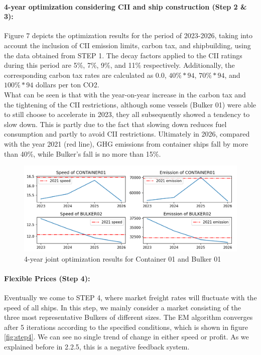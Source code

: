 \documentclass[a4paper,12pt]{article}
\begin{document}
\paragraph{4-year optimization considering CII and ship construction (Step 2 \& 3):}

Figure 7 depicts the optimization results for the period of 2023-2026, taking into account the inclusion of CII emission limits, carbon tax, and shipbuilding, using the data obtained from STEP 1.
The decay factors applied to the CII ratings during this period are 5\%, 7\%, 9\%, and 11\% respectively.
Additionally, the corresponding carbon tax rates are calculated as 0.0, $40\%*94$, $70\% * 94$, and $100\%*94$ dollars per ton CO2.\\

What can be seen is that with the year-on-year increase in the carbon tax and the tightening of the CII restrictions, although some vessels (Bulker 01) were able to still choose to accelerate in 2023, they all subsequently showed a tendency to slow down.
This is partly due to the fact that slowing down reduces fuel consumption and partly to avoid CII restrictions.
Ultimately in 2026, compared with the year 2021 (red line), GHG emissions from container ships fall by more than 40\%, while Bulker's fall is no more than 15\%.


\begin{figure}[htbp]
	\centering
	\includegraphics[width=0.99\linewidth]{report-fig/Step3.png}
	\caption{4-year joint optimization results for Container 01 and Bulker 01}
	\label{fig:step3}
\end{figure}

\paragraph{Flexible Prices (Step 4):}
Eventually we come to STEP 4, where market freight rates will fluctuate with the speed of all ships.
In this step, we mainly consider a market consisting of the three most representative Bulkers of different sizes.
The EM algorithm converges after 5 iterations according to the specified conditions, which is shown in figure \ref{fig:step4}.
We can see no single trend of change in either speed or profit.
As we explained before in 2.2.5, this is a negative feedback system.
\end{document}
